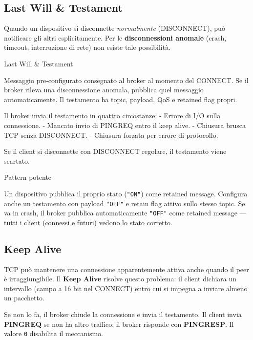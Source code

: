 \documentclass[
  italian,
  openany]{book}
\begin{document}
\subsection{Last Will \& Testament}\label{last-will-testament}

Quando un dispositivo si disconnette \emph{normalmente} (DISCONNECT),
può notificare gli altri esplicitamente. Per le \textbf{disconnessioni
anomale} (crash, timeout, interruzione di rete) non esiste tale
possibilità.

\begin{calloutdefinition}{Last Will \& Testament}

Messaggio pre-configurato consegnato al broker al momento del CONNECT.
Se il broker rileva una disconnessione anomala, pubblica quel messaggio
automaticamente. Il testamento ha topic, payload, QoS e retained flag
propri.

\end{calloutdefinition}

Il broker invia il testamento in quattro circostanze: - Errore di I/O
sulla connessione. - Mancato invio di PINGREQ entro il keep alive. -
Chiusura brusca TCP senza DISCONNECT. - Chiusura forzata per errore di
protocollo.

Se il client si disconnette con DISCONNECT regolare, il testamento viene
scartato.

\begin{callouttip}{Pattern potente}

Un dispositivo pubblica il proprio stato (\texttt{"ON"}) come retained
message. Configura anche un testamento con payload \texttt{"OFF"} e
retain flag attivo sullo stesso topic. Se va in crash, il broker
pubblica automaticamente \texttt{"OFF"} come retained message --- tutti
i client (connessi e futuri) vedono lo stato corretto.

\end{callouttip}

\subsection{Keep Alive}\label{keep-alive}

TCP può mantenere una connessione apparentemente attiva anche quando il
peer è irraggiungibile. Il \textbf{Keep Alive} risolve questo problema:
il client dichiara un intervallo (campo a 16 bit nel CONNECT) entro cui
si impegna a inviare almeno un pacchetto.

Se non lo fa, il broker chiude la connessione e invia il testamento. Il
client invia \textbf{PINGREQ} se non ha altro traffico; il broker
risponde con \textbf{PINGRESP}. Il valore \texttt{0} disabilita il
meccanismo.
\end{document}
